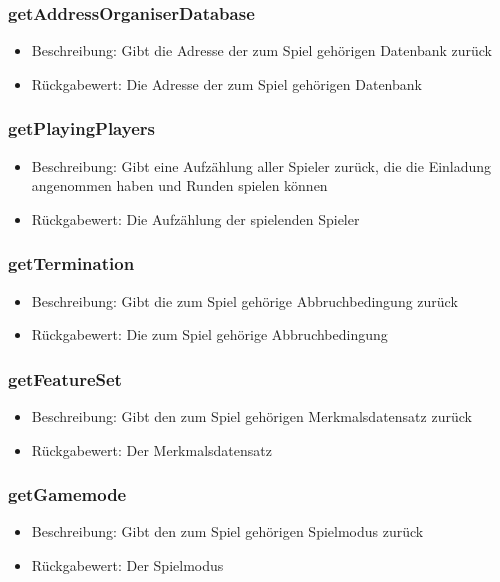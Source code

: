 \documentclass[a4paper]{scrreprt}
\begin{document}
    \subsubsection{getAddressOrganiserDatabase}
    \begin{itemize}
        \item Beschreibung: Gibt die Adresse der zum Spiel gehörigen Datenbank zurück
        \item Rückgabewert: Die Adresse der zum Spiel gehörigen Datenbank
    \end{itemize}
    \subsubsection{getPlayingPlayers}
    \begin{itemize}
        \item Beschreibung: Gibt eine Aufzählung aller Spieler zurück, die die Einladung angenommen haben und Runden spielen können
        \item Rückgabewert: Die Aufzählung der spielenden Spieler
    \end{itemize}
    \subsubsection{getTermination}
    \begin{itemize}
        \item Beschreibung: Gibt die zum Spiel gehörige Abbruchbedingung zurück
        \item Rückgabewert: Die zum Spiel gehörige Abbruchbedingung
    \end{itemize}
    \subsubsection{getFeatureSet}
    \begin{itemize}
        \item Beschreibung: Gibt den zum Spiel gehörigen Merkmalsdatensatz zurück
        \item Rückgabewert: Der Merkmalsdatensatz
    \end{itemize}
    \subsubsection{getGamemode}
    \begin{itemize}
        \item Beschreibung: Gibt den zum Spiel gehörigen Spielmodus zurück
        \item Rückgabewert: Der Spielmodus
    \end{itemize}
\end{document}

